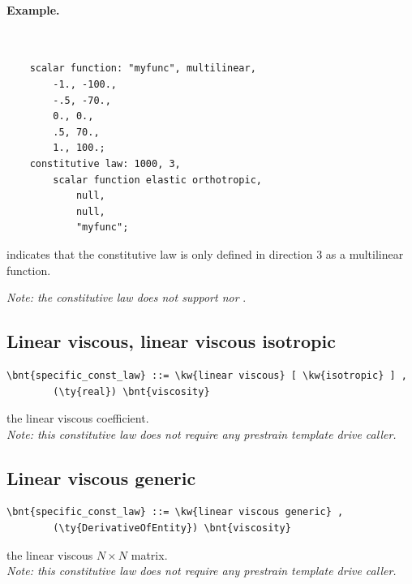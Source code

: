 \paragraph{Example.} \
\begin{verbatim}
    scalar function: "myfunc", multilinear,
        -1., -100.,
        -.5, -70.,
        0., 0.,
        .5, 70.,
        1., 100.;
    constitutive law: 1000, 3,
        scalar function elastic orthotropic,
            null,
            null,
            "myfunc";
\end{verbatim}
indicates that the constitutive law is only defined in direction 3 
as a multilinear function.

\bigskip
\noindent
\emph{Note: the  constitutive law does not support  nor }.

\subsection{Linear viscous, linear viscous isotropic}
\begin{Verbatim}[commandchars=\\\{\}]
    \bnt{specific_const_law} ::= \kw{linear viscous} [ \kw{isotropic} ] , 
        (\ty{real}) \bnt{viscosity}
\end{Verbatim}
the linear viscous coefficient. \\
{\em 
    Note: this constitutive law does not require any prestrain template
    drive caller.
}
  
\subsection{Linear viscous generic}
\begin{Verbatim}[commandchars=\\\{\}]
    \bnt{specific_const_law} ::= \kw{linear viscous generic} , 
        (\ty{DerivativeOfEntity}) \bnt{viscosity}
\end{Verbatim}
the linear viscous $N \times N $ matrix. \\
{\em 
    Note: this constitutive law does not require any prestrain template
    drive caller.
}
  
